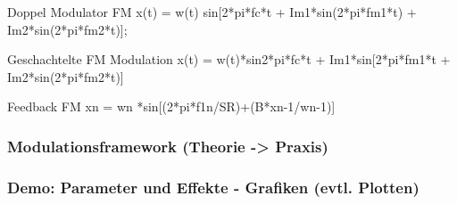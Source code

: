 Doppel Modulator FM
x(t) = w(t) sin[2*pi*fc*t + Im1*sin(2*pi*fm1*t) + Im2*sin(2*pi*fm2*t)];

Geschachtelte FM Modulation
x(t) = w(t)*sin{2*pi*fc*t + Im1*sin[2*pi*fm1*t + Im2*sin(2*pi*fm2*t)]}

Feedback FM 
xn = wn *sin[(2*pi*f1n/SR)+(B*xn-1/wn-1)]

\FloatBarrier
\subsubsection{Modulationsframework (Theorie -> Praxis)}
\FloatBarrier
\subsubsection{Demo: Parameter und Effekte - Grafiken (evtl. Plotten)}